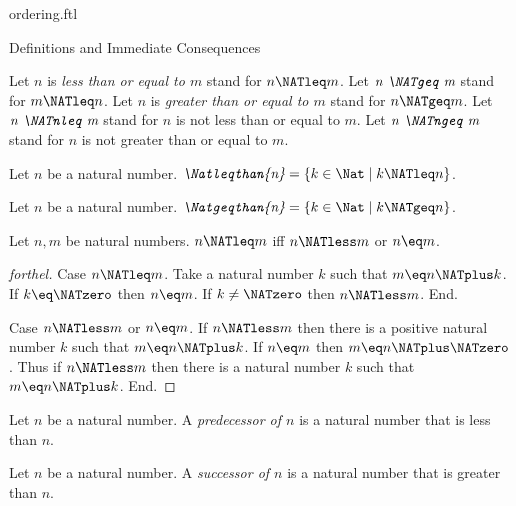 \documentclass{naproche-library}
\begin{document}
\begin{smodule}[title=The Standard Ordering of the Natural Numbers]{ordering.ftl}
\begin{sfragment}{Definitions and Immediate Consequences}
\begin{definition}[forthel,id=ARITHMETIC_04_4593841531256832]
    Let $n$ is \emph{less than or equal to $m$} stand for $n \NATleq m$.
    Let $\emph{n \NATgeq m}$ stand for $m \NATleq n$.
    Let $n$ is \emph{greater than or equal to $m$} stand for $n \NATgeq m$.
    Let $\emph{n \NATnleq m}$ stand for $n$ is not less than or equal to $m$.
    Let $\emph{n \NATngeq m}$ stand for $n$ is not greater than or equal to $m$.
  \end{definition}

  \begin{definition}[forthel,id=ARITHMETIC_04_72501526790144]
    Let $n$ be a natural number.
    $\emph{\Natleqthan{n}} = \{ k \in \Nat \mid k \NATleq n \}$.
  \end{definition}

  \begin{definition}[forthel,id=ARITHMETIC_04_1706933421604864]
    Let $n$ be a natural number.
    $\emph{\Natgeqthan{n}} = \{ k \in \Nat \mid k \NATgeq n \}$.
  \end{definition}

  \begin{proposition}[forthel,id=ARITHMETIC_04_5385415374667776]
    Let $n, m$ be natural numbers.
    $n \NATleq m$ iff $n \NATless m$ or $n \eq m$.
  \end{proposition}
  \begin{proof}[forthel]
    Case $n \NATleq m$.
      Take a natural number $k$ such that $m \eq n \NATplus k$.
      If $k \eq \NATzero$ then $n \eq m$. If $k \neq \NATzero$ then $n \NATless m$.
    End.

    Case $n \NATless m$ or $n \eq m$.
      If $n \NATless m$ then there is a positive natural number $k$ such that $m \eq n \NATplus k$.
      If $n \eq m$ then $m \eq n \NATplus \NATzero$.
      Thus if $n \NATless m$ then there is a natural number $k$ such that $m \eq n \NATplus k$.
    End.
  \end{proof}

  \begin{definition}[forthel,id=ARITHMETIC_04_6232154608500736]
    Let $n$ be a natural number.
    A \emph{predecessor of $n$} is a natural number that is less than $n$.
  \end{definition}

  \begin{definition}[forthel,id=ARITHMETIC_04_8147686326796288]
    Let $n$ be a natural number.
    A \emph{successor of $n$} is a natural number that is greater than $n$.
  \end{definition}


\end{sfragment}
\end{smodule}
\end{document}
